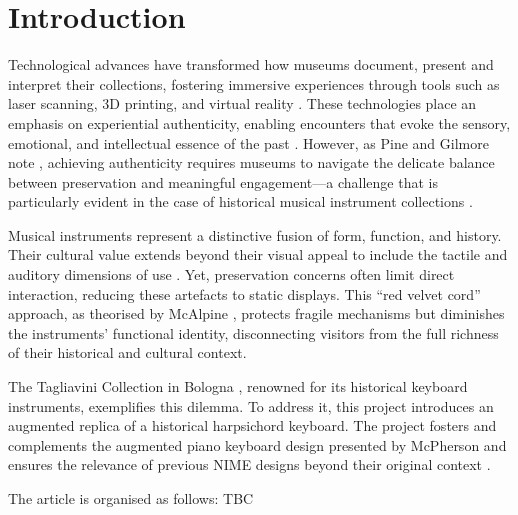 \section{Introduction}\label{introduction}

Technological advances have transformed how museums document, present and interpret their collections, fostering immersive experiences through tools such as laser scanning, 3D printing, and virtual reality \cite{allard2005use,Wachowiak01082009,RCM_2024_3D,Kuzminsky_LaserScan_2012,Schaich_3D_2007}. These technologies place an emphasis on experiential authenticity, enabling encounters that evoke the sensory, emotional, and intellectual essence of the past \cite{trant_Auth_1999}. However, as Pine and Gilmore note \cite{pinegilmore_2007}, achieving authenticity requires museums to navigate the delicate balance between preservation and meaningful engagement—a challenge that is particularly evident in the case of historical musical instrument collections \cite{McAlpine2014}.

Musical instruments represent a distinctive fusion of form, function, and history. Their cultural value extends beyond their visual appeal to include the tactile and auditory dimensions of use \cite{Fritz2017}. Yet, preservation concerns often limit direct interaction, reducing these artefacts to static displays. This ``red velvet cord'' approach, as theorised by McAlpine \cite{McAlpine2014}, protects fragile mechanisms but diminishes the instruments’ functional identity, disconnecting visitors from the full richness of their historical and cultural context.

The Tagliavini Collection in Bologna \cite{Tagliavini2007}, renowned for its historical keyboard instruments, exemplifies this dilemma. To address it, this project introduces an augmented replica of a historical harpsichord keyboard. 
The project fosters and complements the augmented piano keyboard design presented by McPherson \cite{McPherson2013} and ensures the relevance of previous NIME designs beyond their original context \cite{Masu_NIME_2023}. 


The article is organised as follows: TBC





